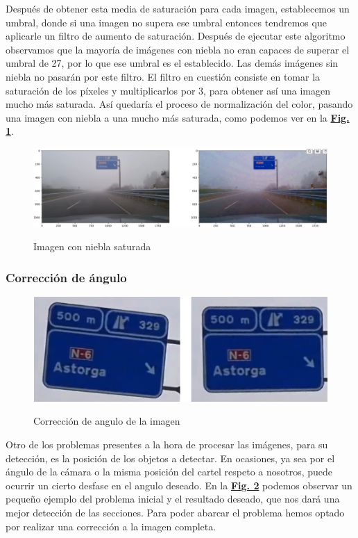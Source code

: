 \documentclass[a4paper, 12pt]{article}
\begin{document}
Después de obtener esta media de saturación para cada imagen, establecemos un umbral, donde si una imagen no supera ese umbral entonces tendremos que aplicarle un filtro de aumento de saturación. Después de ejecutar este algoritmo observamos que la mayoría de imágenes con niebla no eran capaces de superar el umbral de 27, por lo que ese umbral es el establecido. Las demás imágenes sin niebla no pasarán por este filtro. El filtro en cuestión consiste en tomar la saturación de los píxeles y multiplicarlos por 3, para obtener así una imagen mucho más saturada. Así quedaría el proceso de normalización del color, pasando una imagen con niebla a una mucho más saturada, como podemos ver en la \textbf{\hyperref[fig:saturada]{Fig. 1}}.

\begin{figure}[h]
	\centering
	\caption{Imagen con niebla saturada}\vspace{0.5cm}
	\includegraphics[width=0.8\linewidth]{img/saturated_img.png}
	\label{fig:saturada}
\end{figure}

\subsubsection{Corrección de ángulo}
\begin{figure}[h]
	\centering
	\caption{Corrección de angulo de la imagen}\vspace{0.5cm}
	\includegraphics[width=0.8\linewidth]{img/norma_angulo}
	\label{fig:normaangulo}
\end{figure}

Otro de los problemas presentes a la hora de procesar las imágenes, para su detección, es la posición de los objetos a detectar. En ocasiones, ya sea por el ángulo de la cámara o la misma posición del cartel respeto a nosotros, puede ocurrir un cierto desfase en el angulo deseado. En la \textbf{\hyperref[fig:normaangulo]{Fig. 2}} podemos observar un pequeño ejemplo del problema inicial y el resultado deseado, que nos dará una mejor detección de las secciones. Para poder abarcar el problema hemos optado por realizar una corrección a la imagen completa. 
\end{document}
